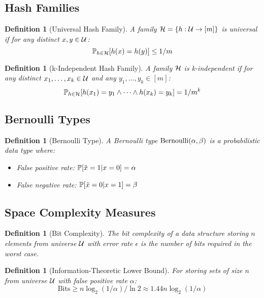 \documentclass[11pt]{article}
\newtheorem{definition}[theorem]{Definition}
\begin{document}
\subsection{Hash Families}

\begin{definition}[Universal Hash Family]
A family $\mathcal{H} = \{h: \mathcal{U} \to [m]\}$ is universal if for any distinct $x, y \in \mathcal{U}$:
$$\mathbb{P}_{h \in \mathcal{H}}[h(x) = h(y)] \leq 1/m$$
\end{definition}

\begin{definition}[k-Independent Hash Family]
A family $\mathcal{H}$ is k-independent if for any distinct $x_1, \ldots, x_k \in \mathcal{U}$ and any $y_1, \ldots, y_k \in [m]$:
$$\mathbb{P}_{h \in \mathcal{H}}[h(x_1) = y_1 \wedge \cdots \wedge h(x_k) = y_k] = 1/m^k$$
\end{definition}

\subsection{Bernoulli Types}

\begin{definition}[Bernoulli Type]
A Bernoulli type $\text{Bernoulli}(\alpha, \beta)$ is a probabilistic data type where:
\begin{itemize}
\item False positive rate: $\mathbb{P}[\tilde{x} = 1 | x = 0] = \alpha$
\item False negative rate: $\mathbb{P}[\tilde{x} = 0 | x = 1] = \beta$
\end{itemize}
\end{definition}

\subsection{Space Complexity Measures}

\begin{definition}[Bit Complexity]
The bit complexity of a data structure storing $n$ elements from universe $\mathcal{U}$ with error rate $\epsilon$ is the number of bits required in the worst case.
\end{definition}

\begin{definition}[Information-Theoretic Lower Bound]
For storing sets of size $n$ from universe $\mathcal{U}$ with false positive rate $\alpha$:
$$\text{Bits} \geq n \log_2(1/\alpha) / \ln 2 \approx 1.44 n \log_2(1/\alpha)$$
\end{definition}
\end{document}
